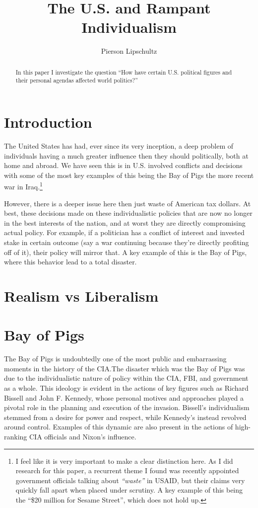 \documentclass[12pt, draft]{article}
\title{The U.S. and Rampant Individualism }
\author{Pierson Lipschultz}
\begin{document}
\maketitle

\begin{abstract}
    In this paper I investigate the question ``How have certain U.S. political figures and their personal agendas affected world politics?''
\end{abstract}


\section{Introduction}
    The United States has had, ever since its very inception, a deep problem of individuals having a much greater influence then they should politically, both at home and abroad. We have seen this is in U.S. involved conflicts and decisions with some of the most key examples of this being the Bay of Pigs the more recent war in Iraq.\footnote{I feel like it is very important to make a clear distinction here. As I did research for this paper, a recurrent  theme I found was recently appointed government officials talking about \textit{``waste''} in USAID, but their claims very quickly fall apart when placed under scrutiny. A key example of this being the ``\$20 million for Sesame Street'', which does not hold up.} 

    However, there is a deeper issue here then just waste of American tax dollars. At best, these decisions made on these individualistic policies that are now no longer in the best interests of the nation, and at worst they are directly compromising actual policy. For example, if a politician has a conflict of interest and invested stake in certain outcome (say a war continuing because they're directly profiting off of it), their policy will mirror that. A key example of this is the Bay of Pigs, where this behavior lead to a total disaster.

\section{Realism vs Liberalism}
\section{Bay of Pigs}

    The Bay of Pigs is undoubtedly one of the most public and embarrassing moments in the history of the CIA.\@ The disaster which was the Bay of Pigs was due to the individualistic nature of policy within the CIA, FBI, and government as a whole. This ideology is evident in the actions of key figures such as Richard Bissell and John F. Kennedy, whose personal motives and approaches played a pivotal role in the planning and execution of the invasion. Bissell's individualism stemmed from a desire for power and respect, while Kennedy's instead revolved around control. Examples of this dynamic are also present in the actions of high-ranking CIA officials and Nixon's influence.~\parencite{JeffreysJones2003}
\end{document}
